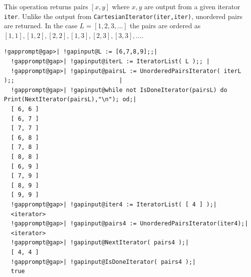 \documentclass[a4paper,11pt]{report}
\begin{document}
{{{ This operation returns pairs $[x,y]$ where $x,y$ are output from a given iterator \texttt{iter}. Unlike the output from \texttt{CartesianIterator(iter,iter)}, unordered pairs are returned. In the case $L = [1,2,3,\ldots]$ the pairs are ordered as $[1,1],[1,2],[2,2],[1,3],[2,3],[3,3],\ldots$. 

 
\begin{Verbatim}[commandchars=!@|,fontsize=\small,frame=single,label=Example]
  !gapprompt@gap>| !gapinput@L := [6,7,8,9];;|
  !gapprompt@gap>| !gapinput@iterL := IteratorList( L );; |
  !gapprompt@gap>| !gapinput@pairsL := UnorderedPairsIterator( iterL );;                              |
  !gapprompt@gap>| !gapinput@while not IsDoneIterator(pairsL) do Print(NextIterator(pairsL),"\n"); od;|
  [ 6, 6 ]
  [ 6, 7 ]
  [ 7, 7 ]
  [ 6, 8 ]
  [ 7, 8 ]
  [ 8, 8 ]
  [ 6, 9 ]
  [ 7, 9 ]
  [ 8, 9 ]
  [ 9, 9 ]
  !gapprompt@gap>| !gapinput@iter4 := IteratorList( [ 4 ] );|
  <iterator>
  !gapprompt@gap>| !gapinput@pairs4 := UnorderedPairsIterator(iter4);|
  <iterator>
  !gapprompt@gap>| !gapinput@NextIterator( pairs4 );|
  [ 4, 4 ]
  !gapprompt@gap>| !gapinput@IsDoneIterator( pairs4 );|
  true
\end{Verbatim}
 }

 }

 }

         
\end{document}
